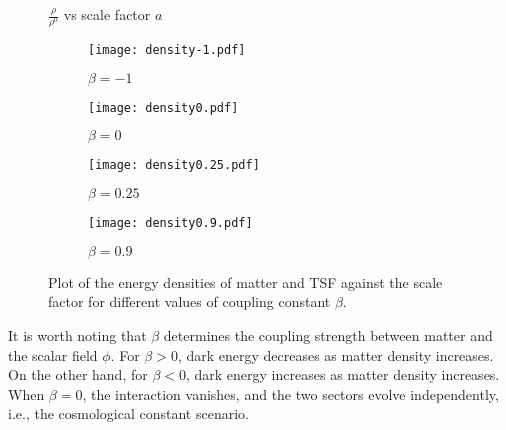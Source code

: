 \documentclass[preprint,aps,floatfix]{revtex4}
\begin{document}
    \begin{figure}[h]
        \centering
        $\displaystyle\frac{\rho}{\rho^0}$ vs scale factor $a$\vspace{10pt}\\
        \begin{subfigure}{0.46\textwidth}
            \centering
            \texttt{[image: density-1.pdf]}
            \caption{$\beta = -1$}
        \end{subfigure}
        \begin{subfigure}{0.5\textwidth}
            \centering
            \texttt{[image: density0.pdf]}
            \caption{$\beta = 0$}
        \end{subfigure}
        \begin{subfigure}{0.46\textwidth}
            \centering
            \texttt{[image: density0.25.pdf]}
            \caption{$\beta = 0.25$}
        \end{subfigure}
        \begin{subfigure}{0.5\textwidth}
            \centering
            \texttt{[image: density0.9.pdf]}
            \caption{$\beta = 0.9$}
        \end{subfigure}
        \caption{Plot of the energy densities of matter and TSF against the scale factor for different values of coupling constant $\beta$.}\label{fig: densities}
    \end{figure}

    It is worth noting that $\beta$ determines the coupling strength between matter and the scalar field $\phi$. For $\beta > 0$, dark energy decreases as matter density increases. On the other hand, for $\beta < 0$, dark energy increases as matter density increases. When $\beta = 0$, the interaction vanishes, and the two sectors evolve independently, i.e., the cosmological constant scenario.

\end{document}

